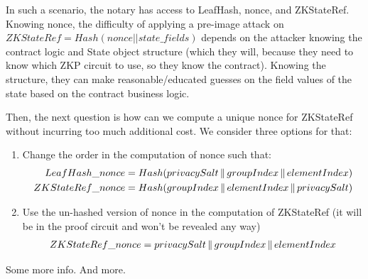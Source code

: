 In such a scenario, the notary has access to LeafHash, nonce, and ZKStateRef.
Knowing nonce, the difficulty of applying a pre-image attack on $ZKStateRef = Hash(nonce || state\_fields)$ depends on the attacker knowing the contract logic and State object structure (which they will, because they need to know which ZKP circuit to use, so they know the contract).
Knowing the structure, they can make reasonable/educated guesses on the field values of the state based on the contract business logic.

Then, the next question is how can we compute a unique nonce for ZKStateRef without incurring too much additional cost.
We consider three options for that:

\begin{enumerate}
\item Change the order in the computation of nonce such that:
\begin{align}
LeafHash\_nonce &= Hash(privacySalt \operatorname{\mathbin\Vert} groupIndex \operatorname{\mathbin\Vert} elementIndex) \\
ZKStateRef\_nonce &= Hash(groupIndex \operatorname{\mathbin\Vert} elementIndex \operatorname{\mathbin\Vert} privacySalt)
\end{align}
\item Use the un-hashed version of nonce in the computation of ZKStateRef (it will be in the proof circuit and won't be revealed any way)
\begin{align}
ZKStateRef\_nonce = privacySalt \operatorname{\mathbin\Vert} groupIndex \operatorname{\mathbin\Vert} elementIndex
\end{align}
\end{enumerate}



Some more info. And more.























